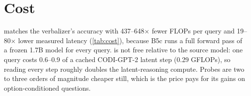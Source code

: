\section{Cost}
\label{sec:cost}
\begin{table}[t]
\centering
\footnotesize
\setlength{\tabcolsep}{2pt}
\caption{Reader cost on CODI-GPT-2 (one RTX 4090 shared with other jobs, so latencies are not isolated hardware limits; latency shown for Q3, batch 1 / 64; FLOPs at batch 1 count matrix and attention multiply--adds only). B3/B6 trainable parameters are per question type; \clr{} and B5c share one model across types. B6's total includes a frozen 38.7M option-embedding table.}
\label{tab:cost}
\end{table}
\clr{} matches the verbalizer's accuracy with 437--648$\times$ fewer FLOPs per query and 19--80$\times$ lower measured latency (\cref{tab:cost}), because B5c runs a full forward pass of a frozen 1.7B model for every query. \clr{} is not free relative to the source model: one query costs 0.6--0.9 of a cached CODI-GPT-2 latent step (0.29 GFLOPs), so reading every step roughly doubles the latent-reasoning compute. Probes are two to three orders of magnitude cheaper still, which is the price \clr{} pays for its gains on option-conditioned questions.
